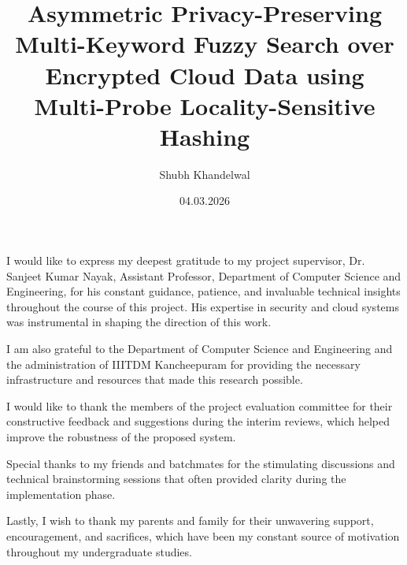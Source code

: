 \documentclass[BTech]{iiitdmdiss}
\begin{document}
\title{Asymmetric Privacy-Preserving Multi-Keyword Fuzzy Search over Encrypted Cloud Data using Multi-Probe Locality-Sensitive Hashing}
\author{Shubh Khandelwal}
\date{04.03.2026}

\maketitle

\declaration


\certificate

\acknowledgements

I would like to express my deepest gratitude to my project supervisor, Dr. Sanjeet Kumar Nayak, Assistant Professor, Department of Computer Science and Engineering, for his constant guidance, patience, and invaluable technical insights throughout the course of this project. His expertise in security and cloud systems was instrumental in shaping the direction of this work.

I am also grateful to the Department of Computer Science and Engineering and the administration of IIITDM Kancheepuram for providing the necessary infrastructure and resources that made this research possible.

I would like to thank the members of the project evaluation committee for their constructive feedback and suggestions during the interim reviews, which helped improve the robustness of the proposed system.

Special thanks to my friends and batchmates for the stimulating discussions and technical brainstorming sessions that often provided clarity during the implementation phase.

Lastly, I wish to thank my parents and family for their unwavering support, encouragement, and sacrifices, which have been my constant source of motivation throughout my undergraduate studies.
\end{document}

